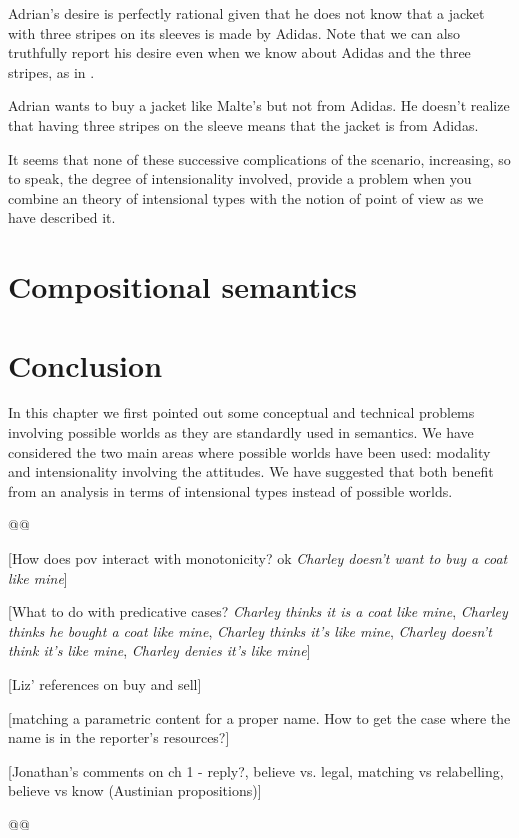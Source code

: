 Adrian's desire is perfectly rational given that he does not know that
a jacket with three stripes on its sleeves is made by Adidas.  Note
that we can also truthfully report his desire even when we know about
Adidas and the three stripes, as in \nexteg{}.
\begin{ex} 
Adrian wants to buy a jacket like Malte's but not from Adidas.  He
doesn't realize that having three stripes on the sleeve means that the
jacket is from Adidas. 
\end{ex} 

It seems that none of these successive complications of the scenario,
increasing, so to speak, the degree of intensionality involved,
provide a problem when you combine an theory of intensional types with
the notion of point of view as we have described it.             
 
\section{Compositional semantics}

\section{Conclusion}  

In this chapter we first pointed out some conceptual and technical
problems involving possible worlds as they are standardly used in semantics.
We have considered the two main areas where possible
worlds have been used: modality and intensionality involving the
attitudes.  We have suggested that both benefit from an analysis in
terms of intensional types instead of possible worlds.

@@

[How does pov interact with monotonicity?  ok \textit{Charley doesn't want
to buy a coat like mine}]

[What to do with predicative cases? \textit{Charley thinks it is a
  coat like mine}, \textit{Charley thinks he bought a coat like mine},
\textit{Charley thinks it's like mine},
\textit{Charley doesn't think it's like mine},
\textit{Charley denies it's like mine}]




[Liz' references on buy and sell] 
  
[matching a parametric content for a proper name.  How to get the case
where the name is in the reporter's resources?]  

[Jonathan's comments on ch 1 - reply?,  believe vs. legal,
matching vs relabelling, believe vs know (Austinian propositions)]

@@

